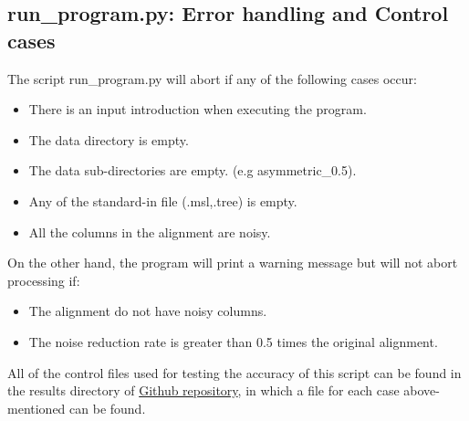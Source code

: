 \documentclass[12pt]{article}
\begin{document}
\subsection{run\_program.py: Error handling and Control cases }

The script run\_program.py will abort if any of the following cases occur:
\begin{itemize}
	\item There is an input introduction when executing the program.
	\item The data directory is empty.
	\item The data sub-directories are empty. (e.g asymmetric\_0.5).
	\item Any of the standard-in file (.msl,.tree) is empty.
	\item All the columns in the alignment are noisy. 
\end{itemize}
On the other hand, the program will  print a warning message but will not abort processing if:
\begin{itemize}
	\item The alignment do not have noisy columns.
	\item The noise reduction rate is greater than 0.5 times the original alignment.
\end{itemize}

All of the control files used for testing the accuracy of this script can be found in the results directory of  \href{https://github.com/msarrias/protein_multial_noise_reduction/tree/master/results/control_case_data}{Github repository}, in which a file for each case above-mentioned can be found.
\end{document}
